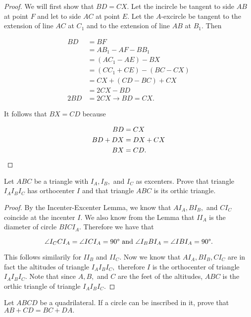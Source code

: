 \documentclass[letterpaper,oneside]{scrartcl}
\begin{document}
\begin{proof}  We will first show that $BD=CX$. Let the incircle be tangent to side $AB$ at point $F$ and let to side $AC$ at point $E$. Let the $A$-excircle be tangent to the extension of line $AC$ at $C_1$ and to the extension of line $AB$ at $B_1$. Then

  \begin{align*}
    BD  & = BF                      \\
        & = AB_1 - AF - BB_1        \\
        & = (AC_1 - AE) - BX        \\
        & = (CC_1 + CE) - (BC - CX) \\
        & = CX + (CD - BC) + CX     \\
        & = 2CX - BD                \\
    2BD & =2CX \rightarrow BD = CX.
  \end{align*}

  It follows that $BX=CD$ because

  \begin{align*}
    BD      & = CX         \\
    BD + DX & = DX + CX    \\
    BX      & = CD. \space
  \end{align*}
\end{proof}
\begin{lemma*}
  [2.24]
  Let $ABC$ be a triangle with $I_A, I_B,$ and $I_C$ as excenters. Prove that triangle $I_AI_BI_C$ has orthocenter $I$ and that triangle $ABC$ is its orthic triangle.
\end{lemma*}

\begin{proof}  By the Incenter-Excenter Lemma, we know that $AI_A, BI_B,$ and $CI_C$ coincide at the incenter $I$. We also know from the Lemma that $II_A$ is the diameter of circle $BICI_A.$ Therefore we have that

  $$\angle {I_CCI_A} = \angle {ICI_A} =  90\degree \text{ and } \angle {I_BBI_A} = \angle {IBI_A} = 90\degree .$$

  This follows similarily for $II_B$ and $II_C.$ Now we know that $AI_A, BI_B, CI_C$ are in fact the altitudes of triangle $I_AI_BI_C,$ therefore $I$ is the orthocenter of triangle $I_AI_BI_C.$ Note that since $A,B,$ and $C$ are the feet of the altitudes, $ABC$ is the orthic triangle of triangle $I_AI_BI_C.$ \end{proof}

\begin{theorem*}
  Let $ABCD$ be a quadrilateral. If a circle can be inscribed in it, prove that $AB + CD = BC + DA.$
\end{theorem*}
\end{document}
